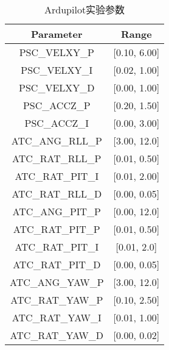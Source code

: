 \begin{table}[ht]
\small
\caption{Ardupilot实验参数}
\label{tab:fix_param}
\centering
\begin{tabular}{cc}
        \toprule[1.5pt]
         Parameter & Range  \\
        \midrule[0.8pt]
         PSC\_VELXY\_P & [0.10, 6.00]  \\ 
       
         PSC\_VELXY\_I & [0.02, 1.00]\\
       
         PSC\_VELXY\_D & [0.00, 1.00] \\
       
         PSC\_ACCZ\_P & [0.20, 1.50] \\
       
         PSC\_ACCZ\_I & [0.00, 3.00]  \\
       
         ATC\_ANG\_RLL\_P & [3.00, 12.0] \\
       
         ATC\_RAT\_RLL\_P &  [0.01, 0.50]  \\
        
         ATC\_RAT\_PIT\_I & [0.01, 2.00]  \\
        
         ATC\_RAT\_RLL\_D & [0.00, 0.05]  \\
        
         ATC\_ANG\_PIT\_P & [0.00, 12.0]  \\
       
         ATC\_RAT\_PIT\_P & [0.01, 0.50]  \\
        
         ATC\_RAT\_PIT\_I & [0.01, 2.0]  \\
        
         ATC\_RAT\_PIT\_D & [0.00, 0.05]  \\
       
         ATC\_ANG\_YAW\_P & [3.00, 12.0]  \\
       
         ATC\_RAT\_YAW\_P & [0.10, 2.50]  \\
       
         ATC\_RAT\_YAW\_I & [0.01, 1.00] \\

        ATC\_RAT\_YAW\_D & [0.00, 0.02] \\


        \bottomrule[1.5pt]
\end{tabular}
\end{table}
